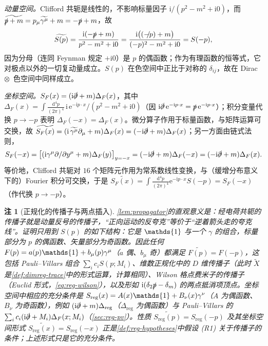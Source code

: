 \documentclass[UTF8,a4paper,11pt,fontset=fandol]{ctexart}
\makeatletter
\let\amsmathbb\mathbb
\renewcommand{\mathbb}[1]{\ifx1#1\mathds{1}\else\amsmathbb{#1}\fi}
\theoremstyle{cplain}
\theoremstyle{cdefinition}
\theoremstyle{cremark}
\newtheorem{remark}[theorem]{注}
\renewcommand{\proofname}{证明}
\renewenvironment{proof}[1][\proofname]{\par\pushQED{\qed}\normalfont\topsep6\p@\@plus6\p@\relax
  \trivlist\item[\hskip\labelsep\itshape #1\hspace{0.5em}]\ignorespaces}{\popQED\endtrivlist\@endpefalse}
\numberwithin{equation}{section}
\newcommand{\sla}[1]{\slashed{#1}}                  %
\newcommand{\dd}{\mathrm{d}}                         %
\newcommand{\SF}{S_{F}}                              %
\newcommand{\ii}{\mathrm{i}}                        %
\newcommand{\ee}{\mathrm{e}}                        %
\newcommand{\Cconj}[1]{\widetilde{#1}}              %
\makeatother
\begin{document}
\begin{proof}
\emph{动量空间。}Clifford 共轭是线性的，不影响标量因子 $\ii/(p^2-m^2+\ii0)$，而 $\Cconj{\sla p+m}=p_\mu\Cconj{\gamma^\mu}+m=-\sla p+m$，故
\[
\Cconj{S(p)}=\frac{\ii(-\sla p+m)}{p^2-m^2+\ii0}=\frac{\ii\bigl(\sla{(-p)}+m\bigr)}{(-p)^2-m^2+\ii0}=S(-p),
\]
因为分母（连同 Feynman 规定 $+\ii0$）是 $p$ 的偶函数；作为有理函数的恒等式，它对极点以外的一切复动量成立。$S(p)$ 在色空间中正比于对称的 $\delta_{ij}$，故在 Dirac~$\otimes$~色空间中同样成立。

\emph{坐标空间。}$\SF(x)=(\ii\sla\partial+m)\Delta_F(x)$，其中 $\Delta_F(x)=\int\frac{\dd^4p}{(2\pi)^4}\,\ii\,\ee^{-\ii p\cdot x}/(p^2-m^2+\ii0)$（因 $\ii\sla\partial\,\ee^{-\ii p\cdot x}=\sla p\,\ee^{-\ii p\cdot x}$）；积分变量代换 $p\to-p$ 表明 $\Delta_F(-x)=\Delta_F(x)$。微分算子作用于标量函数，与矩阵运算可交换，故 $\Cconj{\SF(x)}=(\ii\,\Cconj{\gamma^\mu}\partial_\mu+m)\Delta_F(x)=(-\ii\sla\partial+m)\Delta_F(x)$；另一方面由链式法则，
\[
\SF(-x)=\bigl[(\ii\gamma^\mu\partial/\partial y^\mu+m)\Delta_F(y)\bigr]_{y=-x}=(-\ii\sla\partial+m)\Delta_F(-x)=(-\ii\sla\partial+m)\Delta_F(x).
\]
等价地，Clifford 共轭对 $16$ 个矩阵元作用为常系数线性变换，与（缓增分布意义下的）Fourier 积分可交换，于是 $\Cconj{\SF(x)}=\int\frac{\dd^4p}{(2\pi)^4}\ee^{-\ii p\cdot x}S(-p)=\SF(-x)$（作代换 $p\to-p$）。
\end{proof}

\begin{remark}[正规化的传播子与两点插入]\label{rem:dirac-regprop}
\cref{lem:propagator}的直观意义是：经电荷共轭的传播子就是动量反号的传播子，“正向运动的反夸克”等价于“逆着箭头走的夸克线”。证明只用到 $S(p)$ 的如下结构：它是 $\mathbb 1$ 与一个 $\gamma$ 的组合，标量部分为 $p$ 的偶函数、矢量部分为奇函数。因此任何 $F(p)=a(p)\mathbb 1+b_\mu(p)\gamma^\mu$（$a$ 偶、$b_\mu$ 奇）都满足 $\Cconj{F(p)}=F(-p)$，这包括 Pauli--Villars 组合\cite{PauliVillars1949} $\sum_ic_iS(p;M_i)$、维数正规化中的 $D$ 维传播子（此时 $\Cconj X$ 是\cref{def:dimreg-trace}中的形式运算，计算相同）、Wilson 格点费米子的传播子（Euclid 形式，\cref{eq:reg-wilson}），以及形如 $\ii(\delta_2\sla p-\delta_m)$ 的两点抵消项顶点。坐标空间中相应的充分条件是 $S_{\mathrm{reg}}(x)=A(x)\mathbb 1+B_\nu(x)\gamma^\nu$（$A$ 为偶函数、$B_\nu$ 为奇函数），例如 $(\ii\sla\partial+m)\Delta_{\mathrm{reg}}$（$\Delta_{\mathrm{reg}}$ 为偶函数）与 Pauli--Villars 的 $\sum_ic_i(\ii\sla\partial+M_i)\Delta_F(x;M_i)$（\cref{sec:reg-pv}）。性质 $\Cconj{S_{\mathrm{reg}}(p)}=S_{\mathrm{reg}}(-p)$ 及其坐标空间形式 $\Cconj{S_{\mathrm{reg}}(x)}=S_{\mathrm{reg}}(-x)$ 正是\cref{def:reg-hypotheses}中假设 (R1) 关于传播子的条件；上述形式只是它的充分条件。
\end{remark}
\end{document}
